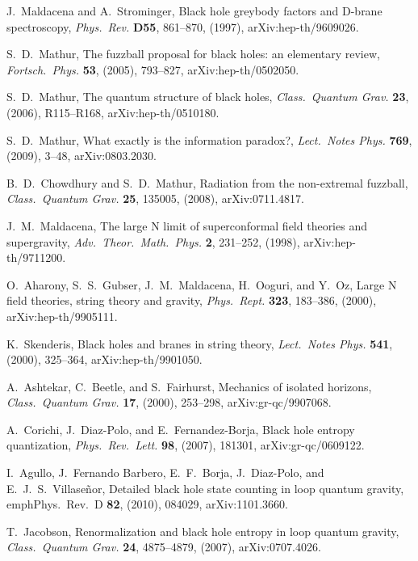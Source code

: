 \documentclass[12pt]{article}
\begin{document}
\begin{thebibliography}{999}
 J.~Maldacena and A.~Strominger, Black hole greybody 
factors and D-brane spectroscopy, \emph{Phys.\ Rev.} {\bf  D55}, 
861--870, (1997), arXiv:hep-th/9609026.

  S.~D.\ Mathur, The fuzzball proposal for black holes: 
an elementary review, \emph{Fortsch.\ Phys.} {\bf 53}, (2005),
793--827, arXiv:hep-th/0502050.

 S.~D.\ Mathur, The quantum structure of black holes,
\emph{Class.\ Quantum Grav.} {\bf 23}, (2006), R115--R168,
arXiv:hep-th/0510180.

 S.~D.\ Mathur, What exactly is the information 
paradox?, \emph{Lect.\ Notes Phys.} {\bf 769}, (2009), 3--48,
arXiv:0803.2030.

 B.~D.\ Chowdhury and S.~D.\ Mathur,
Radiation from the non-extremal fuzzball, \emph{Class.\ Quantum 
Grav.} {\bf 25}, 135005, (2008), arXiv:0711.4817.

 J.~M.\ Maldacena, The large N limit of superconformal 
field theories and supergravity, \emph{Adv.\ Theor.\ Math.\ Phys.}
{\bf 2},  231--252, (1998), arXiv:hep-th/9711200.

 O.\ Aharony, S.~S.\ Gubser, J.~M.\ Maldacena, H.\
Ooguri, and Y.\ Oz, Large N field theories, string theory and gravity,
\emph{Phys.\ Rept.} {\bf 323}, 183--386, (2000), arXiv:hep-th/9905111. 

 K.\ Skenderis, Black holes and branes in string 
theory, \emph{Lect.\ Notes Phys.} {\bf 541}, (2000), 325--364,
arXiv:hep-th/9901050.

 A.\ Ashtekar, C.\ Beetle, and S.\ Fairhurst,
Mechanics of isolated horizons, \emph{Class.\ Quantum Grav.} {\bf 17}, 
(2000), 253--298, arXiv:gr-qc/9907068.

 A.~Corichi,  J.\ Diaz-Polo, and E.~Fernandez-Borja,
Black hole entropy quantization, \emph{Phys.\ Rev.\ Lett.} {\bf 98},
 (2007), 181301,  arXiv:gr-qc/0609122.

 I.\ Agullo, J.~Fernando Barbero, E.~F.\ Borja, J.\ Diaz-Polo,
and E.~J.~S.\ Villase{\~n}or, Detailed black hole state counting in loop 
quantum gravity, emph{Phys.\ Rev.\ D} {\bf 82}, (2010), 084029,
arXiv:1101.3660.

 T.\ Jacobson, Renormalization and black hole 
entropy in loop quantum gravity, \emph{Class.\ Quantum Grav.} {\bf 24},
4875--4879,  (2007),  arXiv:0707.4026.


\end{thebibliography}
\end{document}
